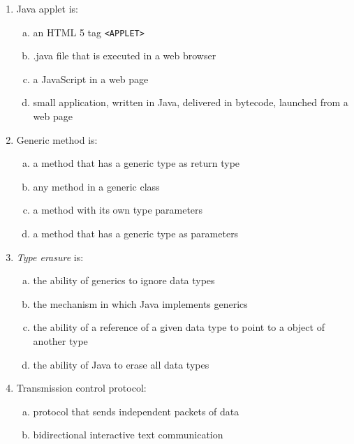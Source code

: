 \documentclass[10pt,a4paper,twocolumn]{article}
\begin{document}
	\thispagestyle{fancy}
	\fancyhf{}
\begin{enumerate}
\item Java applet is:
\begin{enumerate}[(a)]
	\item an HTML 5 tag \texttt{<APPLET>}
	\item .java file that is executed in a web browser
	\item a JavaScript in a web page
	\item small application, written in Java, delivered in bytecode, launched from a web page
\end{enumerate}
\item Generic method is:
\begin{enumerate}[(a)]
	\item a method that has a generic type as return type
	\item any method in a generic class
	\item a method with its own type parameters
	\item a method that has a generic type as parameters
\end{enumerate}
\item \textit{Type erasure} is:
\begin{enumerate}[(a)]
	\item the ability of generics to ignore data types
	\item the mechanism in which Java implements generics
	\item the ability of a reference of a given data type to point to a object of another type
	\item the ability of Java to erase all data types
\end{enumerate}
\item Transmission control protocol:
\begin{enumerate}[(a)]
	\item protocol that sends independent packets of data
	\item bidirectional interactive text communication

\end{enumerate}
\end{enumerate}
\end{document}
